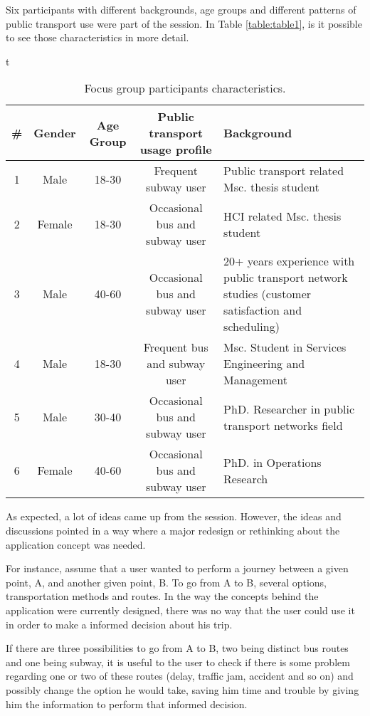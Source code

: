 Six participants with different backgrounds, age groups and different patterns of public transport use were part of the session. In Table \ref{table:table1}, is it possible to see those characteristics in more detail.

\begin{table}{t}

\begin{center}
\begin{tabular}{ c c c c p{5cm} }

  \hline 
  \textbf{\#} & \textbf{Gender} & \textbf{Age Group} & \textbf{Public transport usage profile} & \textbf{Background} \\
  \hline 
  1 & Male & 18-30 & Frequent subway user & Public transport related Msc. thesis
   student \\
  \hline
  2 & Female & 18-30 & Occasional bus and subway user & HCI related Msc. thesis student \\
  \hline
  3 & Male & 40-60 & Occasional bus and subway user & 20+ years experience with public transport
  network studies (customer satisfaction
   and scheduling) \\ 
  \hline
  4 & Male & 18-30 & Frequent bus and subway user & Msc. Student in Services Engineering
   and Management\\
  \hline
  5 & Male & 30-40 & Occasional bus and subway user & PhD. Researcher in public transport
   networks field\\
  \hline
  6 & Female & 40-60 & Occasional bus and subway user & PhD. in Operations Research\\
  \hline
\end{tabular}
\caption{Focus group participants characteristics.}
\label{tab:table1}
\end{center}
\end{table}

As expected, a lot of ideas came up from the session. However, the ideas and discussions pointed in a way where a major redesign or rethinking about the application concept was needed.

For instance, assume that a user wanted to perform a journey between a given point, A, and another given point, B. To go from A to B, several options, transportation methods and routes. In the way the concepts behind the application were currently designed, there was no way that the user could use it in order to make a informed decision about his trip. 

If there are three possibilities to go from A to B, two being distinct bus routes and one being subway, it is useful to the user to check if there is some problem regarding one  or two of these routes (delay, traffic jam, accident and so on) and possibly change the option he would take, saving him time and trouble by giving him the information to perform that informed decision.

